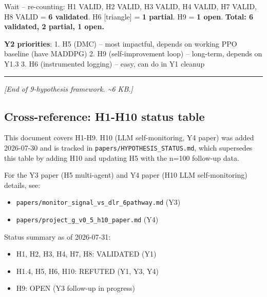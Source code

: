 \documentclass[
]{article}
\providecommand{\tightlist}{%
  \setlength{\itemsep}{0pt}\setlength{\parskip}{0pt}}
\begin{document}
Wait -- re-counting: H1 VALID, H2 VALID, H3 VALID, H4 VALID, H7 VALID,
H8 VALID = \textbf{6 validated}. H6 {[}triangle{]} = \textbf{1 partial}.
H9 = \textbf{1 open}. \textbf{Total: 6 validated, 2 partial, 1 open.}

\textbf{Y2 priorities}: 1. H5 (DMC) -- most impactful, depends on
working PPO baseline (have MADDPG) 2. H9 (self-improvement loop) --
long-term, depends on Y1.3 3. H6 (instrumented logging) -- easy, can do
in Y1 cleanup

\begin{center}\rule{0.5\linewidth}{0.5pt}\end{center}

\emph{{[}End of 9-hypothesis framework. \textasciitilde6 KB.{]}}

\subsection{Cross-reference: H1-H10 status
table}\label{cross-reference-h1-h10-status-table}

This document covers H1-H9. H10 (LLM self-monitoring, Y4 paper) was
added 2026-07-30 and is tracked in
\texttt{papers/HYPOTHESIS\_STATUS.md}, which supersedes this table by
adding H10 and updating H5 with the n=100 follow-up data.

For the Y3 paper (H5 multi-agent) and Y4 paper (H10 LLM self-monitoring)
details, see:

\begin{itemize}
\tightlist
\item
  \texttt{papers/monitor\_signal\_vs\_dlr\_6pathway.md} (Y3)
\item
  \texttt{papers/project\_g\_v0\_5\_h10\_paper.md} (Y4)
\end{itemize}

Status summary as of 2026-07-31:

\begin{itemize}
\tightlist
\item
  H1, H2, H3, H4, H7, H8: VALIDATED (Y1)
\item
  H1.4, H5, H6, H10: REFUTED (Y1, Y3, Y4)
\item
  H9: OPEN (Y3 follow-up in progress)
\end{itemize}
\end{document}
